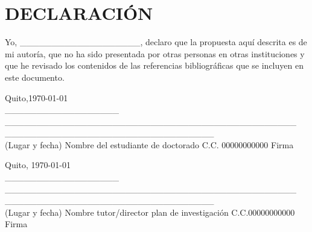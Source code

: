 \documentclass[a4paper,12pt]{article}
\begin{document}
\section*{DECLARACIÓN}

Yo, \_\_\_\_\_\_\_\_\_\_\_\_\_\_\_\_\_\_\_, declaro que la propuesta aquí descrita es de mi autoría, que no ha sido presentada por otras personas en otras instituciones y que he revisado los contenidos de las referencias bibliográficas que se incluyen en este documento.

\vspace{1cm}

\begin{flushleft}
	Quito,\today\\
	\_\_\_\_\_\_\_\_\_\_\_\_\_\_\_\_\_\_\hspace{0.1cm} \_\_\_\_\_\_\_\_\_\_\_\_\_\_\_\_\_\_\_\_\_\_\_\_\_\_\_\_\_\_\_\_\_\_\_\_\_\_\_\_\_\_\_\_\_\_  \hspace{0.3cm}\_\_\_\_\_\_\_\_\_\_\_\_\_\_\_\_\_\hspace{0.1cm}\_\_\_\_\_\_\_\_\_\_\_\_\_\_\_\_\\
	(Lugar y fecha) \hspace{0.2cm} Nombre del estudiante de doctorado \hspace{0.2cm} C.C.\hspace{0.05cm} 00000000000 \hspace{0.1cm} Firma \\
\end{flushleft}

\vspace{1cm}

\begin{flushleft}
	Quito, \today\\
	\_\_\_\_\_\_\_\_\_\_\_\_\_\_\_\_\_\_\hspace{0.1cm} \_\_\_\_\_\_\_\_\_\_\_\_\_\_\_\_\_\_\_\_\_\_\_\_\_\_\_\_\_\_\_\_\_\_\_\_\_\_\_\_\_\_\_\_\_\_  \hspace{0.3cm}\_\_\_\_\_\_\_\_\_\_\_\_\_\_\_\_\_\hspace{0.1cm}\_\_\_\_\_\_\_\_\_\_\_\_\_\_\_\_\\
	(Lugar y fecha) \hspace{0.0cm} Nombre tutor/director plan de investigación \hspace{0.1cm} C.C.\hspace{0.05cm}00000000000 \hspace{0.1cm} Firma \\
\end{flushleft}
\end{document}
